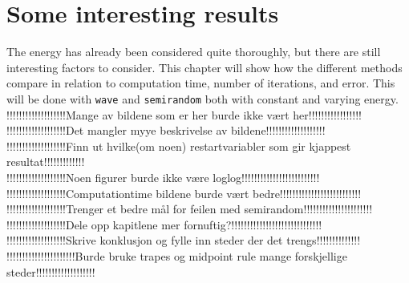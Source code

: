 \chapter{Some interesting results}
The energy has already been considered quite thoroughly, but there are still interesting factors to consider. This chapter will show how the different methods compare in relation to computation time, number of iterations, and error. This will be done with  \texttt{wave} and \texttt{semirandom} both with constant and varying energy.\\

!!!!!!!!!!!!!!!!!!!Mange av bildene som er her burde ikke vært her!!!!!!!!!!!!!!!!!\\
!!!!!!!!!!!!!!!!!!!Det mangler myye beskrivelse av bildene!!!!!!!!!!!!!!!!!!!\\
!!!!!!!!!!!!!!!!!!!Finn ut hvilke(om noen) restartvariabler som gir kjappest resultat!!!!!!!!!!!!!\\
!!!!!!!!!!!!!!!!!!!Noen figurer burde ikke være loglog!!!!!!!!!!!!!!!!!!!!!!!!!\\
!!!!!!!!!!!!!!!!!!!Computationtime bildene burde vært bedre!!!!!!!!!!!!!!!!!!!!!!!!!!\\
!!!!!!!!!!!!!!!!!!!Trenger et bedre mål for feilen med semirandom!!!!!!!!!!!!!!!!!!!!!!\\
!!!!!!!!!!!!!!!!!!!Dele opp kapitlene mer fornuftig?!!!!!!!!!!!!!!!!!!!!!!!!!!!!!\\
!!!!!!!!!!!!!!!!!!!Skrive konklusjon og fylle inn steder der det trengs!!!!!!!!!!!!!!\\
!!!!!!!!!!!!!!!!!!!!!!Burde bruke trapes og midpoint rule mange forskjellige steder!!!!!!!!!!!!!!!!!!!\\

